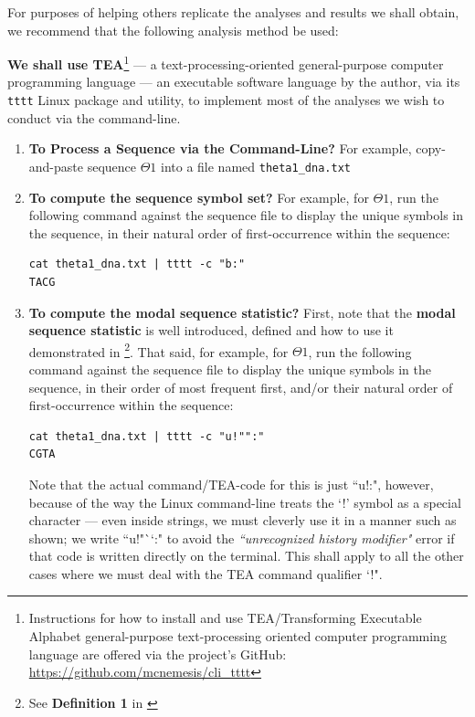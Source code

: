 \documentclass[a4paper, 18pt]{book} %
\begin{document}
For purposes of helping others replicate the analyses and results we shall obtain, we recommend that the following analysis method be used: 


\textbf{We shall use TEA}\footnote{Instructions for how to install and use TEA/Transforming Executable Alphabet general-purpose text-processing oriented computer programming language are offered via the project's GitHub: \url{https://github.com/mcnemesis/cli_tttt}}\cite{Lutalo2024_taz}\cite{cli_tttt} --- a text-processing-oriented general-purpose computer programming language --- an executable software language by the author, via its \texttt{tttt} Linux package and utility, to implement most of the analyses we wish to conduct via the command-line.

\begin{enumerate}
\item {\textbf{To Process a Sequence via the Command-Line?} For example, copy-and-paste sequence $\Theta1$ into a file named \texttt{theta1\_dna.txt}}
\item {\textbf{To compute the sequence symbol set?} For example, for $\Theta1$, run the following command against the sequence file to display the unique symbols in the sequence, in their natural order of first-occurrence within the sequence:

\begin{verbatim}
cat theta1_dna.txt | tttt -c "b:"
TACG
\end{verbatim}

}
\item {\textbf{To compute the modal sequence statistic?} First, note that the \textbf{modal sequence statistic} is well introduced, defined and how to use it demonstrated in \cite{transformatics}\footnote{See \textbf{Definition 1} in \cite{transformatics}}. That said, for example, for $\Theta1$, run the following command against the sequence file to display the unique symbols in the sequence, in their order of most frequent first, and/or their natural order of first-occurrence within the sequence:

\begin{verbatim}
cat theta1_dna.txt | tttt -c "u!"":"
CGTA
\end{verbatim}
Note that the actual command/TEA-code for this is just ``u!:", however, because of the way the Linux command-line treats the `!' symbol as a special character --- even inside strings, we must cleverly use it in a manner such as shown; we write ``u!"``:" to avoid the \textit{``unrecognized history modifier"} error if that code is written directly on the terminal. This shall apply to all the other cases where we must deal with the TEA command qualifier `!"\cite{Lutalo2024_taz}.

}
\end{enumerate}
\end{document}
